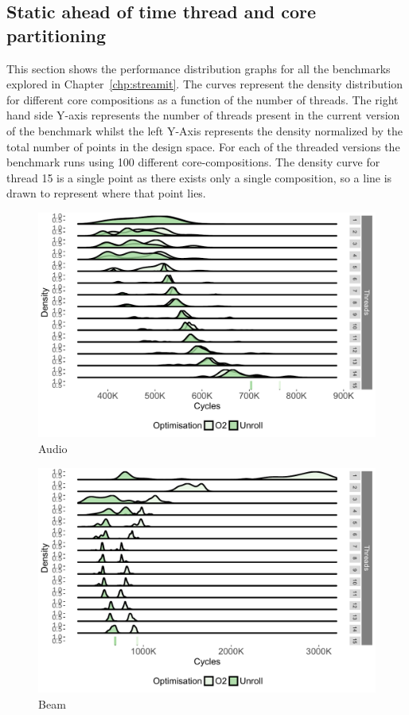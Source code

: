 \begin{appendices}
\chapter{Static ahead of time thread and core partitioning}
This section shows the performance distribution graphs for all the benchmarks explored in Chapter~\ref{chp:streamit}.
The curves represent the density distribution for different core compositions as a function of the number of threads.
The right hand side Y-axis represents the number of threads present in the current version of the benchmark whilst the left Y-Axis represents the density normalized by the total number of points in the design space.
For each of the threaded versions the benchmark runs using 100 different core-compositions.
The density curve for thread 15 is a single point as there exists only a single composition, so a line is drawn to represent where that point lies.
\begin{figure}[!htb]
\center
 \includegraphics[width=1\textwidth]{streamit-paper/graphics/appendixgraphs/audio_total.pdf}
\caption{Audio}\label{chp:stream:at}
\end{figure}

\begin{figure}[!htb]
\center
\includegraphics[width=1\textwidth]{streamit-paper/graphics/appendixgraphs/beamformer_total.pdf}
\caption{Beam}\label{chp:stream:bt}
\end{figure}


\end{appendices}
